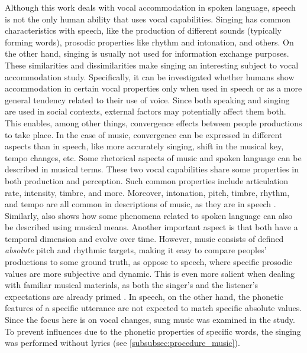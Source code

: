 Although this work deals with vocal accommodation in spoken language, speech is not the only human ability that uses vocal capabilities.
Singing has common characteristics with speech, like the production of different sounds (typically forming words), prosodic properties like rhythm and intonation, and others.
On the other hand, singing is usually not used for information exchange purposes. 
These similarities and dissimilarities make singing an interesting subject to vocal accommodation study.
Specifically, it can be investigated whether humans show accommodation in certain vocal properties only when used in speech or as a more general tendency related to their use of voice.
Since both speaking and singing are used in social contexts, external factors may potentially affect them both.
This enables, among other things, convergence effects between people productions to take place.
In the case of music, convergence can be expressed in different aspects than in speech, like more accurately singing, shift in the musical key, tempo changes, etc.
Some rhetorical aspects of music and spoken language can be described in musical terms.
These two vocal capabilities share some properties in both production and perception.
Such common properties include articulation rate, intensity, timbre, and more.
Moreover, intonation, pitch, timbre, rhythm, and tempo are all common in descriptions of music, as they are in speech \citep{Molino2000toward, Jackendoff2009parallels}.
Similarly, \citet{Day2013speech} also shows how some phenomena related to spoken language can also be described using musical means.
Another important aspect is that both have a temporal dimension and evolve over time.
However, music consists of defined \emph{absolute} pitch and rhythmic targets, making it easy to compare peoples' productions to some ground truth, as oppose to speech, where specific prosodic values are more subjective and dynamic.
This is even more salient when dealing with familiar musical materials, as both the singer's and the listener's expectations are already primed \citep{Meyer2008emotion}.
In speech, on the other hand, the phonetic features of a specific utterance are not expected to match specific absolute values.
Since the focus here is on vocal changes, sung music was examined in the study.
To prevent influences due to the phonetic properties of specific words, the singing was performed without lyrics (see \cref{subsubsec:procedure_music}).

